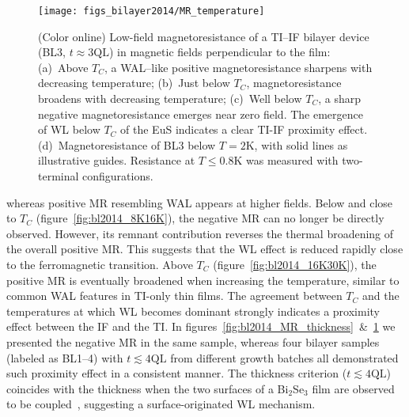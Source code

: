 \begin{figure}[h]%
\centering%
\subfloat{\label{fig:bl2014_16K30K}}%
\subfloat{\label{fig:bl2014_8K16K}}%
\subfloat{\label{fig:bl2014_2K8K}}%
\subfloat{\label{fig:bl2014_He3}}%
\texttt{[image: figs\_bilayer2014/MR\_temperature]}%
\caption[Magnetoresistance of a Bi$_2$Se$_3$--EuS bilayer in different temperature ranges]{\label{fig:bl2014_MR_temperature}(Color online) Low-field magnetoresistance of a TI--IF bilayer device (BL3, $t\approx3\mathrm{QL}$) in magnetic fields perpendicular to the film: (a)~Above $T_C$, a WAL--like positive magnetoresistance sharpens with decreasing temperature; (b)~Just below $T_C$, magnetoresistance broadens with decreasing temperature; (c)~Well below $T_C$, a sharp negative magnetoresistance emerges near zero field. The emergence of WL below $T_C$ of the EuS indicates a clear TI-IF proximity effect. (d)~Magnetoresistance of BL3 below $T=2$K, with solid lines as illustrative guides. Resistance at $T\leq0.8\mathrm{K}$ was measured with two-terminal configurations.}
\end{figure}%
%
whereas positive MR resembling WAL appears at higher fields. Below and close to $T_C$ (figure~\ref{fig:bl2014_8K16K}), the negative MR can no longer be directly observed. However, its remnant contribution reverses the thermal broadening of the overall positive MR. This suggests that the WL effect is reduced rapidly close to the ferromagnetic transition. Above $T_C$ (figure~\ref{fig:bl2014_16K30K}), the positive MR is eventually broadened when increasing the temperature, similar to common WAL features in TI-only thin films. The agreement between $T_C$ and the temperatures at which WL becomes dominant strongly indicates a proximity effect between the IF and the TI. In figures~\ref{fig:bl2014_MR_thickness}~\&~\ref{fig:bl2014_MR_temperature} we presented the negative MR in the same sample, whereas four bilayer samples (labeled as BL1--4) with $t\lesssim4\mathrm{QL}$ from different growth batches all demonstrated such proximity effect in a consistent manner. The thickness criterion ($t\lesssim4\mathrm{QL}$) coincides with the thickness when the two surfaces of a Bi$_2$Se$_3$ film are observed to be coupled~\cite{ARPES_thickness}, suggesting a surface-originated WL mechanism.

